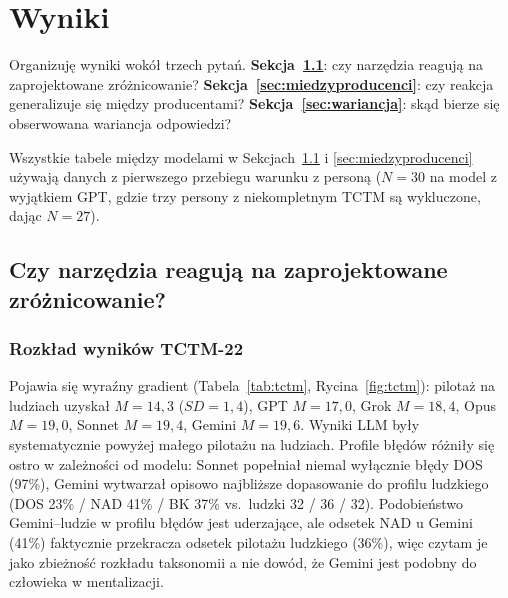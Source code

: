 \documentclass[11pt,a4paper]{article}
\begin{document}
\section{Wyniki}

Organizuję wyniki wokół trzech pytań. \textbf{Sekcja~\ref{sec:reaguja}}: czy narzędzia reagują na zaprojektowane zróżnicowanie? \textbf{Sekcja~\ref{sec:miedzyproducenci}}: czy reakcja generalizuje się między producentami? \textbf{Sekcja~\ref{sec:wariancja}}: skąd bierze się obserwowana wariancja odpowiedzi?

Wszystkie tabele między modelami w Sekcjach~\ref{sec:reaguja} i \ref{sec:miedzyproducenci} używają danych z pierwszego przebiegu warunku z personą ($N = 30$ na model z wyjątkiem GPT, gdzie trzy persony z niekompletnym TCTM są wykluczone, dając $N = 27$).

\subsection{Czy narzędzia reagują na zaprojektowane zróżnicowanie?}\label{sec:reaguja}

\subsubsection*{Rozkład wyników TCTM-22}

Pojawia się wyraźny gradient (Tabela~\ref{tab:tctm}, Rycina~\ref{fig:tctm}): pilotaż na ludziach uzyskał $M = 14{,}3$ ($SD = 1{,}4$), GPT $M = 17{,}0$, Grok $M = 18{,}4$, Opus $M = 19{,}0$, Sonnet $M = 19{,}4$, Gemini $M = 19{,}6$. Wyniki LLM były systematycznie powyżej małego pilotażu na ludziach. Profile błędów różniły się ostro w zależności od modelu: Sonnet popełniał niemal wyłącznie błędy DOS (97\%), Gemini wytwarzał opisowo najbliższe dopasowanie do profilu ludzkiego (DOS 23\% / NAD 41\% / BK 37\% vs.\ ludzki 32 / 36 / 32). Podobieństwo Gemini--ludzie w profilu błędów jest uderzające, ale odsetek NAD u Gemini (41\%) faktycznie przekracza odsetek pilotażu ludzkiego (36\%), więc czytam je jako zbieżność rozkładu taksonomii a nie dowód, że Gemini jest podobny do człowieka w mentalizacji.
\end{document}
